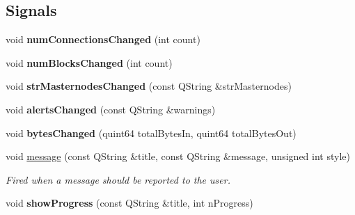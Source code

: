 \subsection*{Signals}
\begin{DoxyCompactItemize}
\item 
\mbox{\label{class_client_model_a8eea0203366271384b0bf62f1f39a56c}} 
void {\bfseries num\+Connections\+Changed} (int count)
\item 
\mbox{\label{class_client_model_a649c53bba0c617d026cdcd22c243fa26}} 
void {\bfseries num\+Blocks\+Changed} (int count)
\item 
\mbox{\label{class_client_model_a88af296dda48dda54141100dc7f6e3bf}} 
void {\bfseries str\+Masternodes\+Changed} (const Q\+String \&str\+Masternodes)
\item 
\mbox{\label{class_client_model_ae40a55475e8a39d928ce861e67f5497f}} 
void {\bfseries alerts\+Changed} (const Q\+String \&warnings)
\item 
\mbox{\label{class_client_model_a06dd7e0e518b70e73684ca679bdf93b5}} 
void {\bfseries bytes\+Changed} (quint64 total\+Bytes\+In, quint64 total\+Bytes\+Out)
\item 
\mbox{\label{class_client_model_a84d325a879455b518492e4541dd45dac}} 
void \mbox{\hyperlink{class_client_model_a84d325a879455b518492e4541dd45dac}{message}} (const Q\+String \&title, const Q\+String \&message, unsigned int style)
\begin{DoxyCompactList}\small\item\em Fired when a message should be reported to the user. \end{DoxyCompactList}\item 
\mbox{\label{class_client_model_a0b0ff10589ec0fd323251be7aa0fa6a2}} 
void {\bfseries show\+Progress} (const Q\+String \&title, int n\+Progress)
\end{DoxyCompactItemize}
